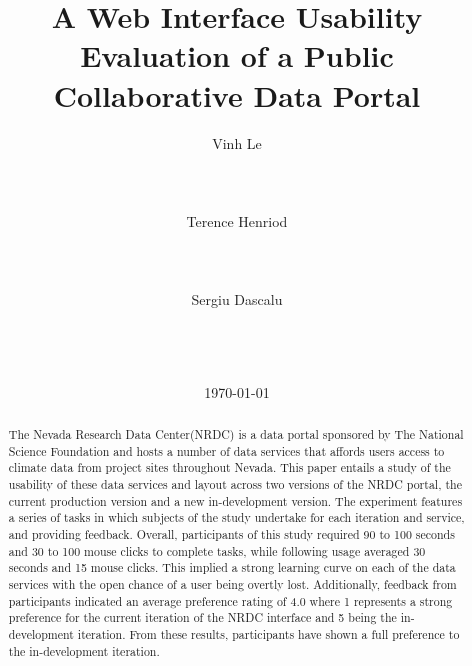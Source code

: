 \documentclass{acm_proc_article-sp}
\begin{document}
\title{A Web Interface Usability Evaluation of a Public Collaborative Data Portal}

\author{
\alignauthor
Vinh Le\\
       \\
       \\
       \\
\alignauthor
Terence Henriod \\
       \\
       \\
       \\
\alignauthor
Sergiu Dascalu\\
       \\
       \\
       \\
}

\date{\today}


\maketitle
\begin{abstract}
The Nevada Research Data Center(NRDC) is a data portal sponsored by The National Science Foundation and hosts a number of data services that affords users access to climate data from project sites throughout Nevada. This paper entails a study of the usability of these data services and layout across two versions of the NRDC portal, the current production version and a new in-development version. The experiment features a series of tasks in which subjects of the study undertake for each iteration and service, and providing feedback. Overall, participants of this study required 90 to 100 seconds and 30 to 100 mouse clicks to complete tasks, while following usage averaged 30 seconds and 15 mouse clicks. This implied a strong learning curve on each of the data services with the open chance of a user being overtly lost. Additionally, feedback from participants indicated an average preference rating of 4.0 where 1 represents a strong preference for the current iteration of the NRDC interface and 5 being the in-development iteration. From these results, participants have shown a full preference to the in-development iteration. 
\end{abstract}
\end{document}
